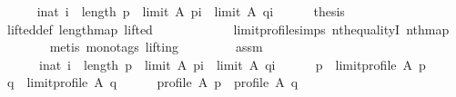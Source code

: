 \begin{isabellebody}
\ \ \ \ \isamarkupfalse%
\ {\isachardoublequoteopen}{\isasymforall}i{\isacharcolon}{\kern0pt}{\isacharcolon}{\kern0pt}nat{\isachardot}{\kern0pt}\ i\ {\isacharless}{\kern0pt}\ length\ p\ {\isasymlongrightarrow}\ {\isacharparenleft}{\kern0pt}limit\ A\ {\isacharparenleft}{\kern0pt}p{\isacharbang}{\kern0pt}i{\isacharparenright}{\kern0pt}{\isacharparenright}{\kern0pt}\ {\isacharequal}{\kern0pt}\ {\isacharparenleft}{\kern0pt}limit\ A\ {\isacharparenleft}{\kern0pt}q{\isacharbang}{\kern0pt}i{\isacharparenright}{\kern0pt}{\isacharparenright}{\kern0pt}{\isachardoublequoteclose}\isanewline
\ \ \ \ \isamarkupfalse%
\ {\isacharquery}{\kern0pt}thesis\isanewline
\ \ \ \ \ \ \isamarkupfalse%
\ lifted{\isacharunderscore}{\kern0pt}def\ length{\isacharunderscore}{\kern0pt}map\ lifted\isanewline
\ \ \ \ \ \ \ \ \ \ \ \ limit{\isacharunderscore}{\kern0pt}profile{\isachardot}{\kern0pt}simps\ nth{\isacharunderscore}{\kern0pt}equalityI\ nth{\isacharunderscore}{\kern0pt}map\isanewline
\ \ \ \ \ \ \isamarkupfalse%
\ {\isacharparenleft}{\kern0pt}metis\ {\isacharparenleft}{\kern0pt}mono{\isacharunderscore}{\kern0pt}tags{\isacharcomma}{\kern0pt}\ lifting{\isacharparenright}{\kern0pt}{\isacharparenright}{\kern0pt}\isanewline
\ \ \isamarkupfalse%
\isanewline
\ \ \ \ \isamarkupfalse%
\ assm{\isacharcolon}{\kern0pt}\isanewline
\ \ \ \ \ \ {\isachardoublequoteopen}{\isasymnot}{\isacharparenleft}{\kern0pt}{\isasymforall}i{\isacharcolon}{\kern0pt}{\isacharcolon}{\kern0pt}nat{\isachardot}{\kern0pt}\ i\ {\isacharless}{\kern0pt}\ length\ p\ {\isasymlongrightarrow}\ {\isacharparenleft}{\kern0pt}limit\ A\ {\isacharparenleft}{\kern0pt}p{\isacharbang}{\kern0pt}i{\isacharparenright}{\kern0pt}{\isacharparenright}{\kern0pt}\ {\isacharequal}{\kern0pt}\ {\isacharparenleft}{\kern0pt}limit\ A\ {\isacharparenleft}{\kern0pt}q{\isacharbang}{\kern0pt}i{\isacharparenright}{\kern0pt}{\isacharparenright}{\kern0pt}{\isacharparenright}{\kern0pt}{\isachardoublequoteclose}\isanewline
\ \ \ \ \isamarkupfalse%
\ {\isacharquery}{\kern0pt}p\ {\isacharequal}{\kern0pt}\ {\isachardoublequoteopen}limit{\isacharunderscore}{\kern0pt}profile\ A\ p{\isachardoublequoteclose}\isanewline
\ \ \ \ \isamarkupfalse%
\ {\isacharquery}{\kern0pt}q\ {\isacharequal}{\kern0pt}\ {\isachardoublequoteopen}limit{\isacharunderscore}{\kern0pt}profile\ A\ q{\isachardoublequoteclose}\isanewline
\ \ \ \ \isamarkupfalse%
\ {\isachardoublequoteopen}profile\ A\ {\isacharquery}{\kern0pt}p\ {\isasymand}\ profile\ A\ {\isacharquery}{\kern0pt}q{\isachardoublequoteclose}\isanewline

\end{isabellebody}
